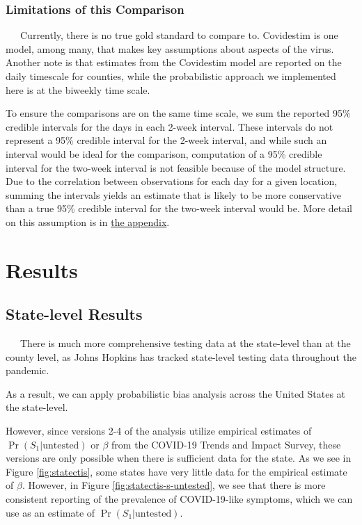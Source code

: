 \documentclass[12pt,twoside]{smiththesis}
\begin{document}
\hypertarget{lims}{%
\subsection{Limitations of this Comparison}\label{lims}}

~~~Currently, there is no true gold standard to compare to. Covidestim is one model, among many, that makes key assumptions about aspects of the virus. Another note is that estimates from the Covidestim model are reported on the daily timescale for counties, while the probabilistic approach we implemented here is at the biweekly time scale.

To ensure the comparisons are on the same time scale, we sum the reported 95\% credible intervals for the days in each 2-week interval. These intervals do not represent a 95\% credible interval for the 2-week interval, and while such an interval would be ideal for the comparison, computation of a 95\% credible interval for the two-week interval is not feasible because of the model structure. Due to the correlation between observations for each day for a given location, summing the intervals yields an estimate that is likely to be more conservative than a true 95\% credible interval for the two-week interval would be. More detail on this assumption is in \protect\hyperlink{conservativeintervals}{the appendix}.

\hypertarget{res}{%
\chapter{Results}\label{res}}

\hypertarget{state-level-results}{%
\section{State-level Results}\label{state-level-results}}

~~~There is much more comprehensive testing data at the state-level than at the county level, as Johns Hopkins has tracked state-level testing data throughout the pandemic.

As a result, we can apply probabilistic bias analysis across the United States at the state-level.

However, since versions 2-4 of the analysis utilize empirical estimates of \(\Pr(S_1|\text{untested})\) or \(\beta\) from the COVID-19 Trends and Impact Survey, these versions are only possible when there is sufficient data for the state. As we see in Figure \ref{fig:statectis}, some states have very little data for the empirical estimate of \(\beta\). However, in Figure \ref{fig:statectis-s-untested}, we see that there is more consistent reporting of the prevalence of COVID-19-like symptoms, which we can use as an estimate of \(\Pr(S_1|\text{untested})\).
\end{document}
